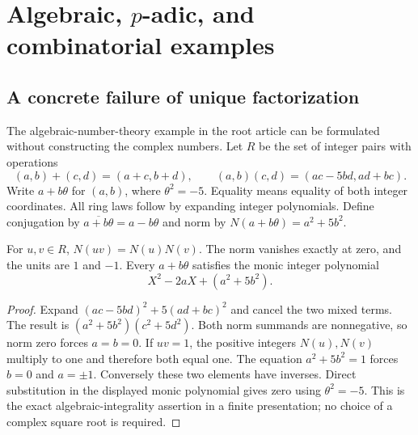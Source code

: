\section{Algebraic, \texorpdfstring{$p$}{p}-adic, and combinatorial examples}\label{sec:algebraic}

\subsection{A concrete failure of unique factorization}
The algebraic-number-theory example in the root article can be formulated without constructing the complex numbers. Let $R$ be the set of integer pairs with operations
\[
 (a,b)+(c,d)=(a+c,b+d),\qquad
 (a,b)(c,d)=(ac-5bd,ad+bc).
\]
Write $a+b\theta$ for $(a,b)$, where $\theta^2=-5$. Equality means equality of both integer coordinates. All ring laws follow by expanding integer polynomials. Define conjugation by $\overline{a+b\theta}=a-b\theta$ and norm by $N(a+b\theta)=a^2+5b^2$.

\begin{theorem}\label{ag:norm}
For $u,v\in R$, $N(uv)=N(u)N(v)$. The norm vanishes exactly at zero, and the units are $1$ and $-1$. Every $a+b\theta$ satisfies the monic integer polynomial
\[
 X^2-2aX+(a^2+5b^2).
\]
\end{theorem}
\begin{proof}
Expand $(ac-5bd)^2+5(ad+bc)^2$ and cancel the two mixed terms. The result is $(a^2+5b^2)(c^2+5d^2)$. Both norm summands are nonnegative, so norm zero forces $a=b=0$. If $uv=1$, the positive integers $N(u),N(v)$ multiply to one and therefore both equal one. The equation $a^2+5b^2=1$ forces $b=0$ and $a=\pm1$. Conversely these two elements have inverses. Direct substitution in the displayed monic polynomial gives zero using $\theta^2=-5$. This is the exact algebraic-integrality assertion in a finite presentation; no choice of a complex square root is required.
\end{proof}

